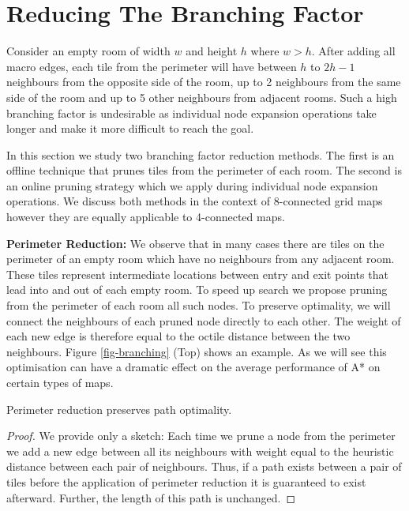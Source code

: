 \section{Reducing The Branching Factor}
Consider an empty room of width $w$ and height $h$ where $w > h$.  After adding
all macro edges, each tile from the perimeter will have between $h$ to $2h-1$
neighbours from the opposite side of the room, up to 2 neighbours from the same
side of the room and up to 5 other neighbours from adjacent rooms.  Such a high
branching factor is undesirable as individual node expansion operations take
longer and make it more difficult to reach the goal.  \par In this section we
study two branching factor reduction methods.  The first is an offline technique
that prunes tiles from the perimeter of each room.  The second is an online
pruning strategy which we apply during individual node expansion operations.  We
discuss both methods in the context of 8-connected grid maps however they are
equally applicable to 4-connected maps.
\\ \par \noindent
\textbf{Perimeter Reduction:}
We observe that in many cases there are tiles on the perimeter of an empty room which have no neighbours from any 
adjacent room. 
These tiles represent intermediate locations between entry and exit points that lead into and out of each empty room.
To speed up search we propose pruning from the perimeter of each room all such nodes.
To preserve optimality, we will connect the neighbours of each pruned node directly to each other.
The weight of each new edge is therefore equal to the octile distance between the two neighbours.
Figure \ref{fig-branching} (Top) shows an example.
As we will see this optimisation can have a dramatic effect on the average performance of
A* on certain types of maps.

\begin{lemma}
Perimeter reduction preserves path optimality.
\end{lemma}
\begin{proof}
We provide only a sketch:
Each time we prune a node from the perimeter we add a new edge between all its
neighbours with weight equal to the heuristic distance between each pair of 
neighbours.
Thus, if a path exists between a pair of tiles before the application of
perimeter reduction it is guaranteed to exist afterward.
Further, the length of this path is unchanged.
\end{proof}

